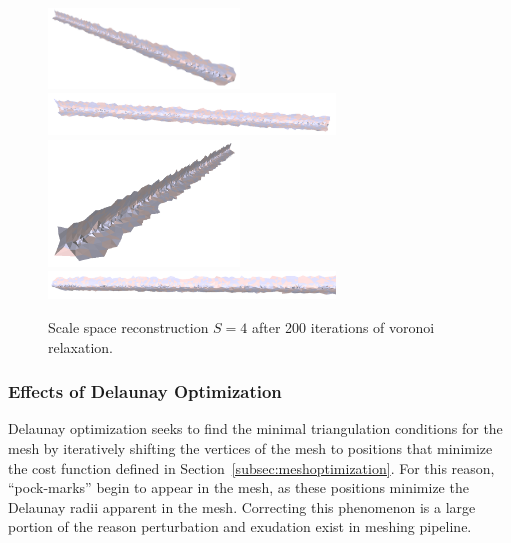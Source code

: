 \documentclass[12pt]{drexelthesis}
\let\Oldsubsubsection\subsubsection
\renewcommand{\subsubsection}{\FloatBarrier\Oldsubsubsection}
\begin{document}
\begin{figure}[!ht]
	\centering
		\includegraphics[width=2in]{simulated-lab-scan/0noise/optimized/scalespace4lloyd00.png}
		\includegraphics[width=3in]{simulated-lab-scan/0noise/optimized/scalespace4lloyd01.png}
		\includegraphics[width=2in]{simulated-lab-scan/0noise/optimized/scalespace4lloyd02.png}
		\includegraphics[width=3in]{simulated-lab-scan/0noise/optimized/scalespace4lloyd03.png}
		\caption[Scale space reconstruction $S = 4$ after 200 iterations of voronoi relaxation]{\centering Scale space reconstruction $S = 4$ after 200 iterations of voronoi relaxation.}
	\label{zeronoise:scalespace4lloyd}
\end{figure}


\subsubsection{Effects of Delaunay Optimization}

Delaunay optimization seeks to find the minimal triangulation conditions for the mesh by iteratively shifting the vertices of the mesh to positions that minimize the cost function defined in Section~\ref{subsec:meshoptimization}. For this reason, ``pock-marks'' begin to appear in the mesh, as these positions minimize the Delaunay radii apparent in the mesh. Correcting this phenomenon is a large portion of the reason perturbation and exudation exist in meshing pipeline.
\end{document}
